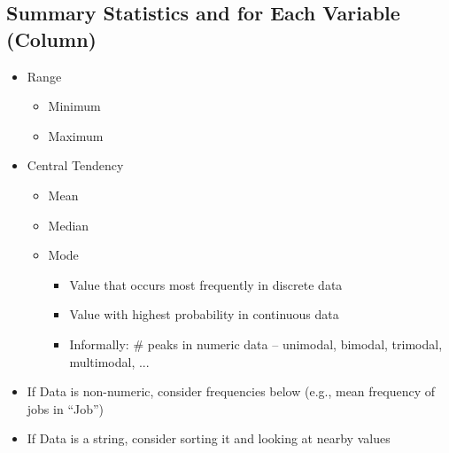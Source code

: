 \documentclass[11pt]{article}
\theoremstyle{definition}
\begin{document}
\subsection{Summary Statistics and for Each Variable (Column)}
\begin{itemize}
    \item Range
    \begin{itemize}
        \item Minimum
        \item Maximum
    \end{itemize}
    \item Central Tendency
    \begin{itemize}
        \item Mean
        \item Median
        \item Mode
        \begin{itemize}
            \item Value that occurs most frequently in discrete data
            \item Value with highest probability in continuous data
            \item Informally: \# peaks in numeric data – unimodal, bimodal, trimodal, multimodal, ...
        \end{itemize}
    \end{itemize}
    \item If Data is non-numeric, consider frequencies below (e.g., mean frequency of jobs in “Job”)
    \item If Data is a string, consider sorting it and looking at nearby values
\end{itemize}
\end{document}
